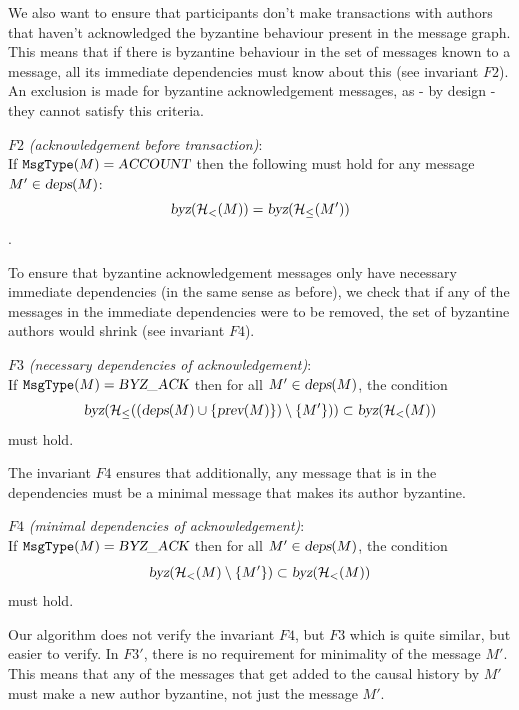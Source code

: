 \documentclass{article}
\begin{document}
We also want to ensure that participants don't make transactions with authors that haven't acknowledged the byzantine behaviour present in the message graph. This means that if there is byzantine behaviour in the set of messages known to a message, all its immediate dependencies must know about this (see invariant $F2$). An exclusion is made for byzantine acknowledgement messages, as - by design - they cannot satisfy this criteria.
\begin{invariant}{$F2$}
    \emph{(acknowledgement before transaction)}:\\
    If $\texttt{MsgType}(M) = \textsl{ACCOUNT}$ then the following must hold for any message $M' \in \textsl{deps}(M)$:
    $$\textsl{byz}(\mathcal H_<(M)) = \textsl{byz}(\mathcal H_\leq(M'))$$.
\end{invariant}

To ensure that byzantine acknowledgement messages only have necessary immediate dependencies (in the same sense as before), we check that if any of the messages in the immediate dependencies were to be removed, the set of byzantine authors would shrink (see invariant $F4$).

\begin{invariant}{$F3$}
    \emph{(necessary dependencies of acknowledgement)}:\\
    If $\texttt{MsgType}(M) = \textsl{BYZ\_ACK}$ then for all $M'\in \textsl{deps}(M)$, the condition $$\textsl{byz}(\mathcal H_\le((\textsl{deps}(M) \cup \{\textsl{prev}(M)\}) \setminus \{M'\}) ) \subset \textsl{byz}(\mathcal H_<(M))$$ must hold.
\end{invariant}

The invariant $F4$ ensures that additionally, any message that is in the dependencies must be a minimal message that makes its author byzantine.

\begin{invariant}{$F4$}
    \emph{(minimal dependencies of acknowledgement)}:\\
    If $\texttt{MsgType}(M) = \textsl{BYZ\_ACK}$ then for all $M'\in \textsl{deps}(M)$, the condition $$\textsl{byz}(\mathcal H_<(M) \setminus \{M'\}) \subset \textsl{byz}(\mathcal H_<(M))$$ must hold.
\end{invariant}

Our algorithm does not verify the invariant $F4$, but $F3$ which is quite similar, but easier to verify. In $F3'$, there is no requirement for minimality of the message $M'$. This means that any of the messages that get added to the causal history by $M'$ must make a new author byzantine, not just the message $M'$.
\end{document}
